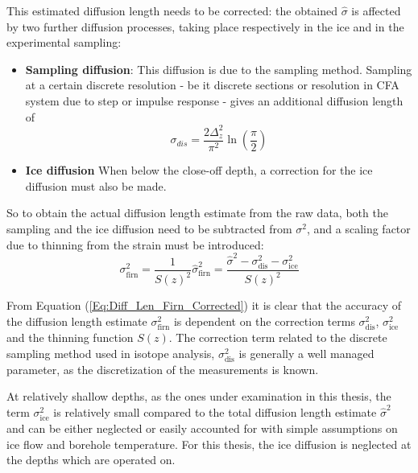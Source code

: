 \documentclass[../../CompleteThesis2/Complete_2ndDraft]{subfiles}
\begin{document}
This estimated diffusion length needs to be corrected: the obtained $\hat{\sigma}$ is affected by two further diffusion processes, taking place respectively in the ice and in the experimental sampling:
\begin{itemize}
	\item \textbf{Sampling diffusion}: This diffusion is due to the sampling method. Sampling at a certain discrete resolution - be it discrete sections or resolution in CFA system due to step or impulse response - gives an additional diffusion length of
	\begin{equation}
		\sigma_{dis} = \frac{2 \Delta_z^2}{\pi^2}\ln\left(\frac{\pi}{2}\right)
		\label{Eq:Diff_Len_corr_Discrete}
	\end{equation}
	\item \textbf{Ice diffusion} When below the close-off depth, a correction for the ice diffusion must also be made.
\end{itemize} 

So to obtain the actual diffusion length estimate from the raw data, both the sampling and the ice diffusion need to be subtracted from $\sigma^2$, and a scaling factor due to thinning from the strain must be introduced:
\begin{equation}
	\sigma_{\text{firn}}^2 = \frac{1}{S(z)^2}\hat{\sigma}_{\text{firn}}^2 = \frac{\hat{\sigma}^2 - \sigma_{\text{dis}}^2 - \sigma_{\text{ice}}^2}{S(z)^2}
	\label{Eq:Diff_Len_Firn_Corrected}
\end{equation}

From Equation (\ref{Eq:Diff_Len_Firn_Corrected}) it is clear that the accuracy of the diffusion length estimate $\sigma_{\text{firn}}^2$ is dependent on the correction terms $\sigma_{\text{dis}}^2$, $\sigma_{\text{ice}}^2$ and the thinning function $S(z)$. The correction term related to the discrete sampling method used in isotope analysis, $\sigma_{\text{dis}}^2$ is generally a well managed parameter, as the discretization of the measurements is known. 

At relatively shallow depths, as the ones under examination in this thesis, the term $\sigma_{\text{ice}}^2$ is relatively small compared to the total diffusion length estimate $\hat{\sigma}^2$ and can be either neglected or easily accounted for with simple assumptions on ice flow and borehole temperature. For this thesis, the ice diffusion is neglected at the depths which are operated on.
\end{document}
